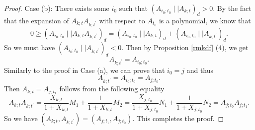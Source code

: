 \documentclass{amsart}
\theoremstyle{definition}
\theoremstyle{remark}
\numberwithin{equation}{section}
\begin{document}
\begin{proof}
Case (b): There exists some $i_0$ such that $(A_{i_0;t_0}\mid\mid  A_{k;t})_d>0$. By the fact that the expansion of $A_{k;t}A_{k;t^\prime}$ with respect to $A_{t_0}$ is a polynomial, we know that $$0\geq(A_{i_0;t_0}\mid\mid  A_{k;t}A_{k;t^\prime})_d=(A_{i_0;t_0}\mid\mid  A_{k;t})_d+ (A_{i_0;t_0}\mid\mid  A_{k;t^\prime})_d.$$
So we must have $(A_{i_0;t_0}\mid\mid  A_{k;t^\prime})_d<0$. Then by Proposition \ref{rmkdf} (4), we get $$A_{k;t^\prime}=A_{i_0;t_0}.$$  Similarly to the proof in Case (a), we can prove that $i_0=j$ and thus $$A_{k;t^\prime}=A_{i_0;t_0}=A_{j;t_0}.$$ Then $A_{k;t}=A_{j;t_1}$ follows from the following equality
$$A_{k;t}A_{k;t^\prime}=\frac{X_{k;t}}{1+X_{k;t}}M_1+\frac{1}{1+X_{k;t}}M_2=\frac{X_{j;t_0}}{1+X_{j;t_0}}N_1+\frac{1}{1+X_{j;t_0}}N_2
=A_{j;t_0}A_{j;t_1}.$$ So we have $(A_{k;t},A_{k;t^\prime})=(A_{j;t_1},A_{j;t_0})$. This completes the proof.
\end{proof}
\end{document}
